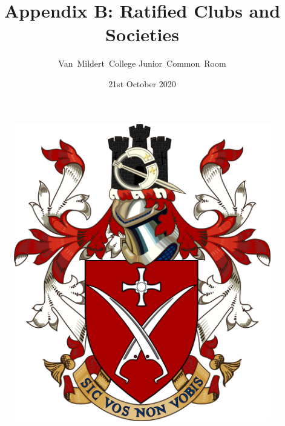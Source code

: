 \documentclass[12pt]{article}  %
\title{Appendix B: Ratified Clubs and Societies}
\author{Van~Mildert~College Junior~Common~Room}
\date{21st October 2020}
\begin{document}
\begin{titlepage}  %
\maketitle
\begin{figure}[h]
\includegraphics[scale=0.25]{arms}  %
\centering
\end{figure}
\thispagestyle{empty}
\end{titlepage}
\setcounter{page}{2}  %
\end{document}
